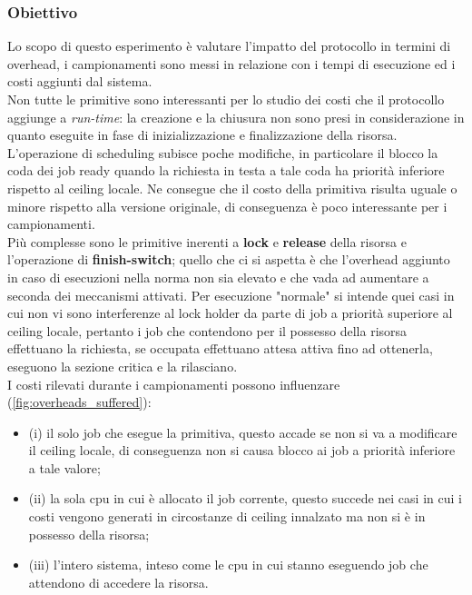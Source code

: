\subsubsection{Obiettivo}
\label{sec:overhead_ob}

\noindent Lo scopo di questo esperimento è valutare l'impatto del protocollo in termini di overhead, i campionamenti sono messi in relazione con i tempi di esecuzione ed i costi aggiunti dal sistema.\\

\noindent Non tutte le primitive sono interessanti per lo studio dei costi che il protocollo aggiunge a \textit{run-time}: la creazione e la chiusura non sono presi in considerazione in quanto eseguite in fase di inizializzazione e finalizzazione della risorsa.\\

\noindent L'operazione di scheduling subisce poche modifiche, in particolare il blocco la coda dei job ready quando la richiesta in testa a tale coda ha priorità inferiore rispetto al ceiling locale. Ne consegue che il costo della primitiva risulta uguale o minore rispetto alla versione originale, di conseguenza è poco interessante per i campionamenti.\\

\noindent Più complesse sono le primitive inerenti a \textbf{lock} e \textbf{release} della risorsa e l'operazione di \textbf{finish-switch}; quello che ci si aspetta è che l'overhead aggiunto in caso di esecuzioni nella norma non sia elevato e che vada ad aumentare a seconda dei meccanismi attivati. Per esecuzione "normale" si intende quei casi in cui non vi sono interferenze al lock holder da parte di job a priorità superiore al ceiling locale, pertanto i job che contendono per il possesso della risorsa effettuano la richiesta, se occupata effettuano attesa attiva fino ad ottenerla, eseguono la sezione critica e la rilasciano.\\

\noindent I costi rilevati durante i campionamenti possono influenzare (\ref{fig:overheads_suffered}):\\

\begin{itemize}
	\item {\color{red} (i)} il solo job che esegue la primitiva, questo accade se non si va a modificare il ceiling locale, di conseguenza non si causa blocco ai job a priorità inferiore a tale valore;
	\item {\color{red} (ii)} la sola cpu in cui è allocato il job corrente, questo succede nei casi in cui i costi vengono generati in circostanze di ceiling innalzato ma non si è in possesso della risorsa;
	\item {\color{red} (iii)} l'intero sistema, inteso come le cpu in cui stanno eseguendo job che attendono di accedere la risorsa.
\end{itemize}

